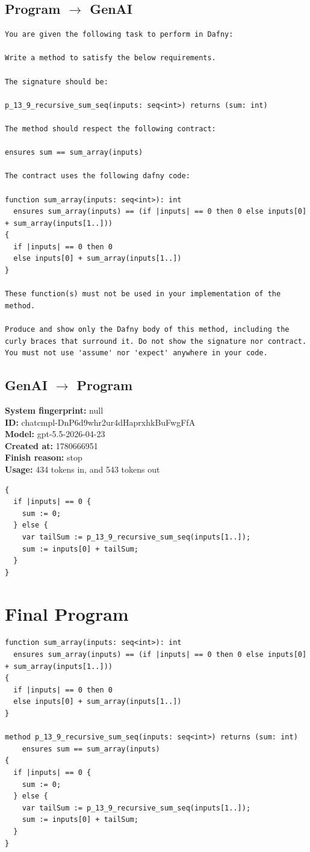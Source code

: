 \documentclass{article}
\begin{document}
\subsection*{Program $\rightarrow$ GenAI}
\begin{lstlisting}
You are given the following task to perform in Dafny:

Write a method to satisfy the below requirements.

The signature should be:

p_13_9_recursive_sum_seq(inputs: seq<int>) returns (sum: int)

The method should respect the following contract:

ensures sum == sum_array(inputs)

The contract uses the following dafny code:

function sum_array(inputs: seq<int>): int
  ensures sum_array(inputs) == (if |inputs| == 0 then 0 else inputs[0] + sum_array(inputs[1..]))
{
  if |inputs| == 0 then 0
  else inputs[0] + sum_array(inputs[1..])
}

These function(s) must not be used in your implementation of the method.

Produce and show only the Dafny body of this method, including the curly braces that surround it. Do not show the signature nor contract. You must not use 'assume' nor 'expect' anywhere in your code.
\end{lstlisting}
\subsection*{GenAI $\rightarrow$ Program}
\textbf{System fingerprint: }null
\\\textbf{ID: }chatcmpl-DnP6d9whr2ur4dHaprxhkBuFwgFfA
\\\textbf{Model: }gpt-5.5-2026-04-23
\\\textbf{Created at: }1780666951
\\\textbf{Finish reason: }stop
\\\textbf{Usage: }434 tokens in, and 543 tokens out
\begin{lstlisting}
{
  if |inputs| == 0 {
    sum := 0;
  } else {
    var tailSum := p_13_9_recursive_sum_seq(inputs[1..]);
    sum := inputs[0] + tailSum;
  }
}
\end{lstlisting}
\section*{Final Program}
\begin{lstlisting}
function sum_array(inputs: seq<int>): int
  ensures sum_array(inputs) == (if |inputs| == 0 then 0 else inputs[0] + sum_array(inputs[1..]))
{
  if |inputs| == 0 then 0
  else inputs[0] + sum_array(inputs[1..])
}

method p_13_9_recursive_sum_seq(inputs: seq<int>) returns (sum: int)
	ensures sum == sum_array(inputs)
{
  if |inputs| == 0 {
    sum := 0;
  } else {
    var tailSum := p_13_9_recursive_sum_seq(inputs[1..]);
    sum := inputs[0] + tailSum;
  }
}
\end{lstlisting}
\end{document}
